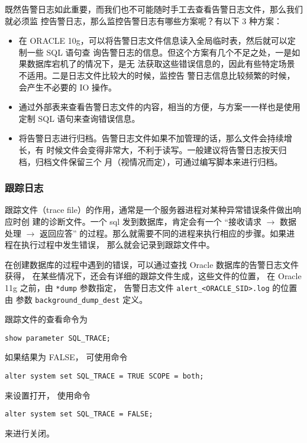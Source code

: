 既然告警日志如此重要，而我们也不可能随时手工去查看告警日志文件，那么我们就必须监
控告警日志，那么监控告警日志有哪些方案呢？有以下 3 种方案：
\begin{itemize}
  \item 在 ORACLE 10g，可以将告警日志文件信息读入全局临时表，然后就可以定制一些 SQL 语句查
    询告警日志的信息。但这个方案有几个不足之处，一是如果数据库宕机了的情况下，是无
    法获取这些错误信息的，因此有些特定场景不适用。二是日志文件比较大的时候，监控告
    警日志信息比较频繁的时候，会产生不必要的 IO 操作。
  \item 通过外部表来查看告警日志文件的内容，相当的方便，与方案一一样也是使用定制
    SQL 语句来查询错误信息。
  \item 将告警日志进行归档。告警日志文件如果不加管理的话，那么文件会持续增长，有
    时候文件会变得非常大，不利于读写。一般建议将告警日志按天归档，归档文件保留三个
    月（视情况而定），可通过编写脚本来进行归档。
\end{itemize}
%
\subsubsection{跟踪日志}
跟踪文件（trace file）的作用，通常是一个服务器进程对某种异常错误条件做出响应时创
建的诊断文件。一个 sql 发到数据库，肯定会有一个
``接收请求 $\rightarrow$ 数据处理 $\rightarrow$ 返回应答''
的过程。那么就需要不同的进程来执行相应的步骤。如果进程在执行过程中发生错误，
那么就会记录到跟踪文件中。

在创建数据库的过程中遇到的错误，可以通过查找 Oracle 数据库的告警日志文件获得，
在某些情况下，还会有详细的跟踪文件生成，这些文件的位置，
在 Oracle 11g 之前，由 \texttt{*dump} 参数指定，
告警日志文件 \texttt{alert\_<ORACLE\_SID>.log} 的位置由
参数 \texttt{background\_dump\_dest} 定义。

跟踪文件的查看命令为
\begin{verbatim}
show parameter SQL_TRACE;
\end{verbatim}
如果结果为 FALSE，
可使用命令
\begin{verbatim}
alter system set SQL_TRACE = TRUE SCOPE = both;
\end{verbatim}
来设置打开，
使用命令
\begin{verbatim}
alter system set SQL_TRACE = FALSE;
\end{verbatim}
来进行关闭。

